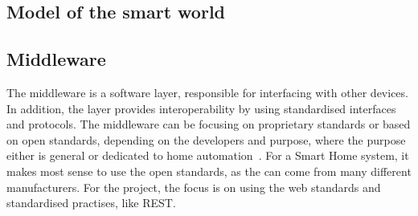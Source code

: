 

\subsection{Model of the smart world}











\subsection{Middleware}
The middleware is a software layer, responsible for interfacing with other devices. In addition, the layer provides interoperability by using standardised interfaces and protocols. The middleware can be focusing on proprietary standards or based on open standards, depending on the developers and purpose, where the purpose either is general or dedicated to home automation~\citep{overview-smart-home-environment}. For a Smart Home system, it makes most sense to use the open standards, as the \sdevs can come from many different manufacturers. For the project, the focus is on using the web standards and standardised practises, like REST.


%